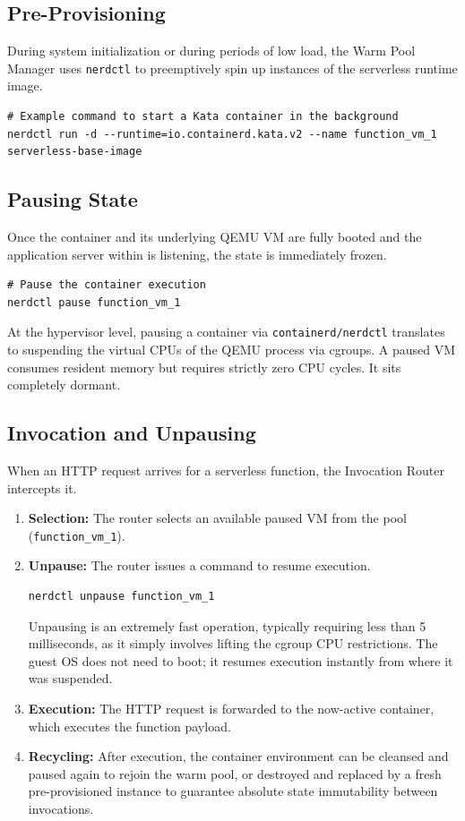 \subsection{Pre-Provisioning}
During system initialization or during periods of low load, the Warm Pool Manager uses \texttt{nerdctl} to preemptively spin up instances of the serverless runtime image.
\begin{verbatim}
# Example command to start a Kata container in the background
nerdctl run -d --runtime=io.containerd.kata.v2 --name function_vm_1 serverless-base-image
\end{verbatim}

\subsection{Pausing State}
Once the container and its underlying QEMU VM are fully booted and the application server within is listening, the state is immediately frozen.
\begin{verbatim}
# Pause the container execution
nerdctl pause function_vm_1
\end{verbatim}
At the hypervisor level, pausing a container via \texttt{containerd/nerdctl} translates to suspending the virtual CPUs of the QEMU process via cgroups. A paused VM consumes resident memory but requires strictly zero CPU cycles. It sits completely dormant.

\subsection{Invocation and Unpausing}
When an HTTP request arrives for a serverless function, the Invocation Router intercepts it.
\begin{enumerate}
    \item \textbf{Selection:} The router selects an available paused VM from the pool (\texttt{function\_vm\_1}).
    \item \textbf{Unpause:} The router issues a command to resume execution.
    \begin{verbatim}
nerdctl unpause function_vm_1
    \end{verbatim}
    Unpausing is an extremely fast operation, typically requiring less than 5 milliseconds, as it simply involves lifting the cgroup CPU restrictions. The guest OS does not need to boot; it resumes execution instantly from where it was suspended.
    \item \textbf{Execution:} The HTTP request is forwarded to the now-active container, which executes the function payload.
    \item \textbf{Recycling:} After execution, the container environment can be cleansed and paused again to rejoin the warm pool, or destroyed and replaced by a fresh pre-provisioned instance to guarantee absolute state immutability between invocations.
\end{enumerate}

